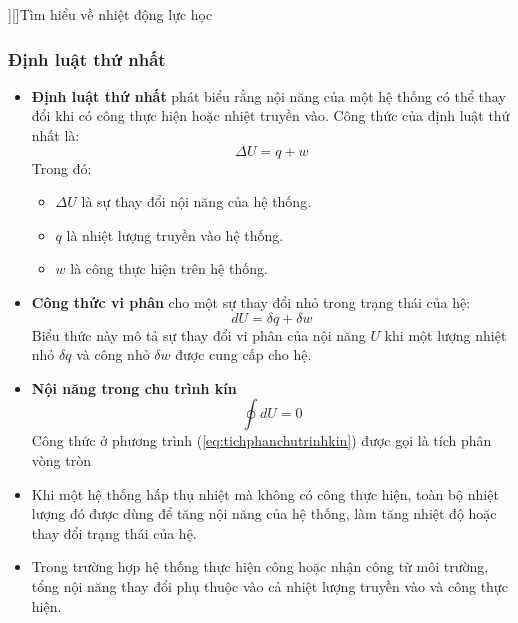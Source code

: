 \documentclass[Main.tex]{subfiles}
\begin{document}
	\begin{center}
		\Noibat[\maunhan][\myfont[20]{qag}][\faApple]{Tìm hiểu về nhiệt động lực học}
	\end{center}
	\subsubsection{Định luật thứ nhất}
	\begin{itemize}
		\item \textbf{Định luật thứ nhất} phát biểu rằng nội năng của một hệ thống có thể thay đổi khi có công thực hiện hoặc nhiệt truyền vào. Công thức của định luật thứ nhất là:
		\begin{equation}
			\Delta U = q + w\label{eq:dinhluat2nhietdonghoc}
		\end{equation}
		Trong đó:
		\begin{itemize}
			\item $\Delta U$ là sự thay đổi nội năng của hệ thống.
			\item $q$ là nhiệt lượng truyền vào hệ thống.
			\item $w$ là công thực hiện trên hệ thống.
		\end{itemize}
		\item \textbf{Công thức vi phân} cho một sự thay đổi nhỏ trong trạng thái của hệ:
		\begin{equation}
			dU = \delta q + \delta w
			\label{eq:tichphannoinang}
		\end{equation}
		Biểu thức này mô tả sự thay đổi vi phân của nội năng $U$ khi một lượng nhiệt nhỏ $ \delta q $ và công nhỏ $ \delta w $ được cung cấp cho hệ.
		\item \textbf{Nội năng trong chu trình kín}
		\begin{equation}
			\oint dU = 0
			\label{eq:tichphanchutrinhkin}
		\end{equation}
		Công thức ở phương trình (\ref{eq:tichphanchutrinhkin}) được gọi là tích phân vòng tròn
	\end{itemize}
	\begin{itemize}
		\item Khi một hệ thống hấp thụ nhiệt mà không có công thực hiện, toàn bộ nhiệt lượng đó được dùng để tăng nội năng của hệ thống, làm tăng nhiệt độ hoặc thay đổi trạng thái của hệ.
		\item Trong trường hợp hệ thống thực hiện công hoặc nhận công từ môi trường, tổng nội năng thay đổi phụ thuộc vào cả nhiệt lượng truyền vào và công thực hiện.
	\end{itemize}
\end{document}
